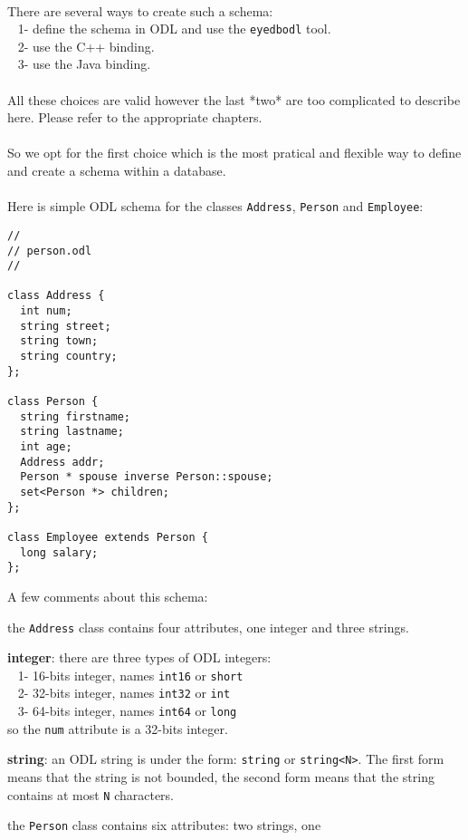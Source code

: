 \\
There are several ways to create such a schema:\\
\mbox{ } 1- define the schema in ODL and use the \texttt{eyedbodl} tool. \\
\mbox{ } 2- use the C++ binding. \\
\mbox{ } 3- use the Java binding. \\
\\
All these choices are valid however the last *two* are too complicated
to describe here. Please refer to the appropriate chapters.
\\
\\
So we opt for the first choice which is the most pratical
and flexible way to define and create a schema within a database.
\\
\\
Here is simple ODL schema for the classes \texttt{Address}, \texttt{Person} 
and \texttt{Employee}:
\verbsize \begin{verbatim}
//
// person.odl
//

class Address {
  int num;
  string street;
  string town;
  string country;
};

class Person {
  string firstname;
  string lastname;
  int age;
  Address addr;
  Person * spouse inverse Person::spouse;
  set<Person *> children;
};

class Employee extends Person {
  long salary;
};
\end{verbatim}
\normalsize
A few comments about this schema:
\bi
\item the \texttt{Address} class contains four attributes, one integer
and three strings.
\bi
\item {\bf integer}: there are three types of ODL integers: \\
\mbox{ } 1- 16-bits integer, names \texttt{int16} or \texttt{short} \\
\mbox{ } 2- 32-bits integer, names \texttt{int32} or \texttt{int} \\
\mbox{ } 3- 64-bits integer, names \texttt{int64} or \texttt{long} \\
so the \texttt{num} attribute is a 32-bits integer.
\item {\bf string}: an ODL string is under the form: \texttt{string} or
\texttt{string<N>}. The
first form means that the string is not bounded, the second form means
that the string contains at most \texttt{N} characters.
\ei
\item the \texttt{Person} class contains six attributes: two strings, one
